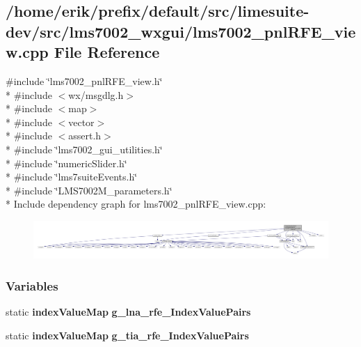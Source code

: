 \subsection{/home/erik/prefix/default/src/limesuite-\/dev/src/lms7002\+\_\+wxgui/lms7002\+\_\+pnl\+R\+F\+E\+\_\+view.cpp File Reference}
\label{lms7002__pnlRFE__view_8cpp}
{\ttfamily \#include \char`\"{}lms7002\+\_\+pnl\+R\+F\+E\+\_\+view.\+h\char`\"{}}\\*
{\ttfamily \#include $<$wx/msgdlg.\+h$>$}\\*
{\ttfamily \#include $<$map$>$}\\*
{\ttfamily \#include $<$vector$>$}\\*
{\ttfamily \#include $<$assert.\+h$>$}\\*
{\ttfamily \#include \char`\"{}lms7002\+\_\+gui\+\_\+utilities.\+h\char`\"{}}\\*
{\ttfamily \#include \char`\"{}numeric\+Slider.\+h\char`\"{}}\\*
{\ttfamily \#include \char`\"{}lms7suite\+Events.\+h\char`\"{}}\\*
{\ttfamily \#include \char`\"{}L\+M\+S7002\+M\+\_\+parameters.\+h\char`\"{}}\\*
Include dependency graph for lms7002\+\_\+pnl\+R\+F\+E\+\_\+view.\+cpp\+:
\nopagebreak
\begin{figure}[H]
\begin{center}
\leavevmode
\includegraphics[width=350pt]{de/d5e/lms7002__pnlRFE__view_8cpp__incl}
\end{center}
\end{figure}
\subsubsection*{Variables}
\begin{DoxyCompactItemize}
\item 
static {\bf index\+Value\+Map} {\bf g\+\_\+lna\+\_\+rfe\+\_\+\+Index\+Value\+Pairs}
\item 
static {\bf index\+Value\+Map} {\bf g\+\_\+tia\+\_\+rfe\+\_\+\+Index\+Value\+Pairs}
\end{DoxyCompactItemize}



